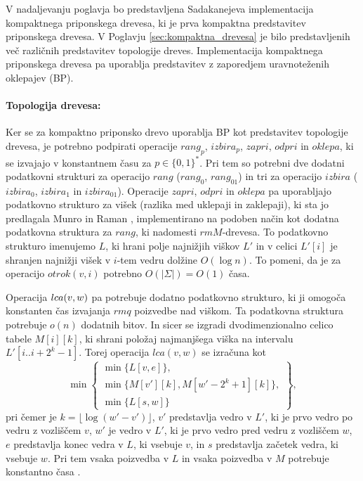 V nadaljevanju poglavja bo predstavljena Sadakanejeva \cite{Sadakane2007} implementacija kompaktnega priponskega drevesa, ki je prva kompaktna predstavitev priponskega drevesa. V Poglavju \ref{sec:kompaktna_drevesa} je bilo predstavljenih več različnih predstavitev topologije dreves. Implementacija kompaktnega priponskega drevesa pa uporablja predstavitev z zaporedjem uravnoteženih oklepajev (BP).

\paragraph{Topologija drevesa:}
Ker se za kompaktno priponsko drevo uporablja BP kot predstavitev topologije drevesa, je potrebno podpirati operacije $rang_p$, $izbira_p$, $zapri$, $odpri$ in $oklepa$, ki se izvajajo v konstantnem času za $p\in\{0,1\} ^*$. Pri tem so potrebni dve dodatni podatkovni strukturi za operacijo $rang$ ($rang_0$, $rang_{01}$) in tri za operacijo $izbira$ ($izbira_0$, $izbira_1$ in $izbira_{01}$). Operacije $zapri$, $odpri$ in $oklepa$ pa uporabljajo podatkovno strukturo za višek (razlika med uklepaji in zaklepaji),  ki sta jo predlagala Munro in Raman \cite{Munro1997}, implementirano na podoben način kot dodatna podatkovna struktura za $rang$, ki nadomesti $rmM$-drevesa. To podatkovno strukturo imenujemo $L$, ki hrani polje najnižjih viškov $L'$ in v celici $L'[i]$ je shranjen najnižji višek v $i$-tem vedru dolžine $O(\log{n})$. To pomeni, da je za operacijo $otrok(v,i)$ potrebno $O(|\Sigma|)=O(1)$ časa. 

Operacija $ \mathop{lca}(v,w) $ pa potrebuje dodatno podatkovno strukturo, ki ji omogoča konstanten čas izvajanja $rmq$ poizvedbe nad viškom. Ta podatkovna struktura potrebuje $o(n)$ dodatnih bitov. In sicer se izgradi dvodimenzionalno celico tabele $M[i][k]$, ki shrani položaj najmanjšega viška na intervalu $L'[i..i+2^k-1]$. Torej operacija $lca(v,w)$ se izračuna kot
\begin{equation*}
    \min\left\{
    \begin{array}{l}
        \min\{L[v,e]\},\\ 
        \min\{M[v'][k],M[w'-2^k+1][k]\},\\
        \min\{L[s,w]\}
    \end{array}\right\},
\end{equation*}
pri čemer je $k=\lfloor \log{(w'-v')\rfloor}$, $v'$ predstavlja vedro v $L'$, ki je prvo vedro po vedru z vozliščem $v$, $w'$ je vedro v $L'$, ki je prvo vedro pred vedru z vozliščem $w$, $e$ predstavlja konec vedra v $L$, ki vsebuje $v$, in $s$ predstavlja začetek vedra, ki vsebuje $w$. Pri tem vsaka poizvedba v $L$ in vsaka poizvedba v $M$ potrebuje konstantno časa \cite{Sadakane2007,Valimaki2007}. 

